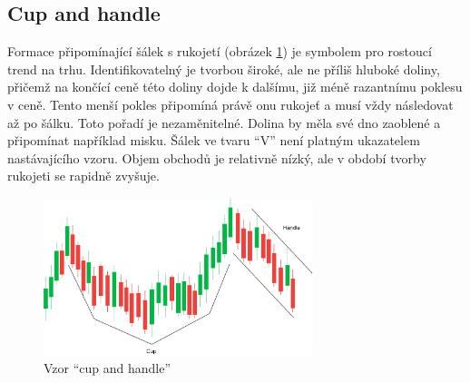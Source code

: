 \subsection{Cup and handle}
Formace připomínající šálek s rukojetí (obrázek \ref{fig:cup-n-handle}) je symbolem pro rostoucí trend na trhu. Identifikovatelný je tvorbou široké, ale ne příliš hluboké doliny, přičemž na končící ceně této doliny dojde k
dalšímu, již méně razantnímu poklesu v ceně. Tento menší pokles připomíná právě onu rukojeť a musí vždy následovat až po šálku. Toto pořadí je nezaměnitelné. Dolina by měla své dno
zaoblené a připomínat například misku. Šálek ve tvaru \enquote{V} není platným ukazatelem nastávajícího vzoru. Objem obchodů je relativně nízký, ale v období tvorby rukojeti se rapidně zvyšuje.
\begin{figure}[htb]
    \centering
    \includegraphics[width=0.7\textwidth]{Figures/Cup-n-handle.pdf}
    \caption{Vzor \enquote{cup and handle}}
    \label{fig:cup-n-handle}
\end{figure}

